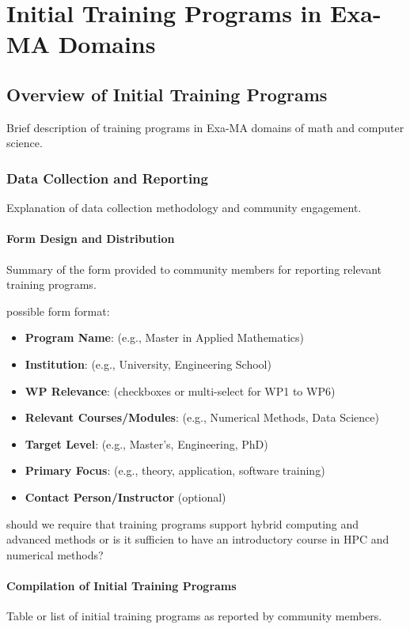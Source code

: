 \chapter{Initial Training Programs in Exa-MA Domains}

\section{Overview of Initial Training Programs}
Brief description of training programs in Exa-MA domains of math and computer science.
\subsection{Data Collection and Reporting}
Explanation of data collection methodology and community engagement.
\subsubsection{Form Design and Distribution}
Summary of the form provided to community members for reporting relevant training programs.

possible form format:
\begin{itemize}
    \item \textbf{Program Name}: (e.g., Master in Applied Mathematics)
    \item \textbf{Institution}: (e.g., University, Engineering School)
    \item \textbf{WP Relevance}: (checkboxes or multi-select for WP1 to WP6)
    \item \textbf{Relevant Courses/Modules}: (e.g., Numerical Methods, Data Science)
    \item \textbf{Target Level}: (e.g., Master’s, Engineering, PhD)
    \item \textbf{Primary Focus}: (e.g., theory, application, software training)
    \item \textbf{Contact Person/Instructor} (optional)
\end{itemize}

should we require that training programs support hybrid computing and advanced methods or is it sufficien to have an introductory course in HPC and numerical methods?

\subsubsection{Compilation of Initial Training Programs}
Table or list of initial training programs as reported by community members.
